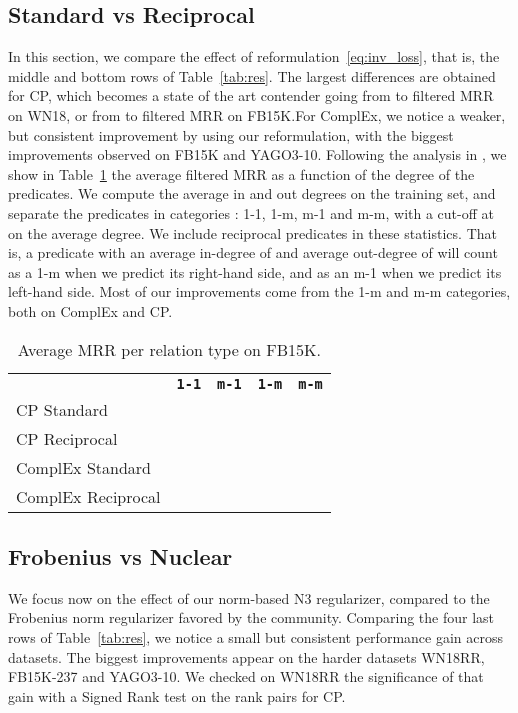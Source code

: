 \documentclass{article}
\newcommand{\CP}{{CP}\xspace}
\newcommand{\complex}{{ComplEx}\xspace}
\newcommand{\fb}{{FB15K}\xspace}
\newcommand{\fbd}{{FB15K-237}\xspace}
\newcommand{\wn}{{WN18}\xspace}
\newcommand{\wnrr}{{WN18RR}\xspace}
\newcommand{\yago}{{YAGO3-10}\xspace}
\begin{document}
\subsection{Standard vs Reciprocal}
In this section, we compare the effect of reformulation~\eqref{eq:inv_loss}, that is, the middle and bottom rows of Table~\ref{tab:res}. The largest differences are obtained for \CP, which becomes a state of the art contender going from  to  filtered MRR on \wn, or from  to  filtered MRR on \fb.For \complex, we notice a weaker, but consistent improvement by using our reformulation, with the biggest improvements observed on \fb and \yago. 
Following the analysis in \citet{bordes_translating_2013}, we show in Table~\ref{tab:mrr_stats} the average filtered MRR as a function of the degree of the predicates. We compute the average in and out degrees on the training set, and separate the predicates in  categories : 1-1, 1-m, m-1 and m-m, with a cut-off at  on the average degree. We include reciprocal predicates in these statistics. That is, a predicate with an average in-degree of  and average out-degree of  will count as a 1-m when we predict its right-hand side, and as an m-1 when we predict its left-hand side. Most of our improvements come from the 1-m and m-m categories, both on \complex and \CP.
\begin{table}[t]
\centering
\begin{tabular}{lcccc}
\toprule
{} & \bf{\texttt{1-1}} & \bf{\texttt{m-1}} & \bf{\texttt{1-m}} & \bf{\texttt{m-m}} \\
\CP Standard          &  &  &  & \\
\CP Reciprocal        &  &  &  & \\
\complex Standard     &  &  &  &  \\
\complex Reciprocal &  &  &  & \\
\bottomrule
\end{tabular}
\caption{Average MRR per relation type on \fb.}
\label{tab:mrr_stats}
\end{table}

\subsection{Frobenius vs Nuclear }
We focus now on the effect of our norm-based N3 regularizer, compared to the Frobenius norm regularizer favored by the community. Comparing the four last rows of Table~\ref{tab:res}, we notice a small but consistent performance gain across datasets. The biggest improvements appear on the harder datasets \wnrr, \fbd and \yago. We checked on \wnrr the significance of that gain with a Signed Rank test on the rank pairs for \CP.
\end{document}
